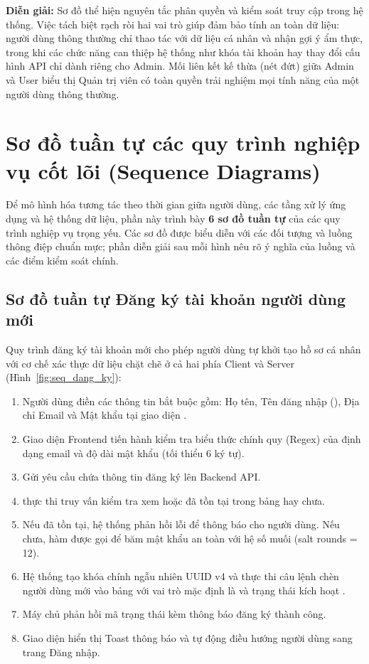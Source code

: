 \noindent\textbf{Diễn giải:} Sơ đồ thể hiện nguyên tắc phân quyền và kiểm soát truy cập trong hệ thống. Việc tách biệt rạch ròi hai vai trò giúp đảm bảo tính an toàn dữ liệu: người dùng thông thường chỉ thao tác với dữ liệu cá nhân và nhận gợi ý ẩm thực, trong khi các chức năng can thiệp hệ thống như khóa tài khoản hay thay đổi cấu hình API chỉ dành riêng cho Admin. Mối liên kết kế thừa (nét đứt) giữa Admin và User biểu thị Quản trị viên có toàn quyền trải nghiệm mọi tính năng của một người dùng thông thường.

\section{Sơ đồ tuần tự các quy trình nghiệp vụ cốt lõi (Sequence Diagrams)}

Để mô hình hóa tương tác theo thời gian giữa người dùng, các tầng xử lý ứng dụng và hệ thống dữ liệu, phần này trình bày \textbf{6 sơ đồ tuần tự } của các quy trình nghiệp vụ trọng yếu. Các sơ đồ được biểu diễn với các đối tượng và luồng thông điệp chuẩn mực; phần diễn giải sau mỗi hình nêu rõ ý nghĩa của luồng và các điểm kiểm soát chính.

\subsection{Sơ đồ tuần tự Đăng ký tài khoản người dùng mới}

Quy trình đăng ký tài khoản mới cho phép người dùng tự khởi tạo hồ sơ cá nhân với cơ chế xác thực dữ liệu chặt chẽ ở cả hai phía Client và Server (Hình~\ref{fig:seq_dang_ky}):
\begin{enumerate}[leftmargin=1.6em, itemsep=2pt]
  \item Người dùng điền các thông tin bắt buộc gồm: Họ tên, Tên đăng nhập (), Địa chỉ Email và Mật khẩu tại giao diện .
  \item Giao diện Frontend tiến hành kiểm tra biểu thức chính quy (Regex) của định dạng email và độ dài mật khẩu (tối thiểu 6 ký tự).
  \item Gửi yêu cầu  chứa thông tin đăng ký lên Backend API.
  \item {} thực thi truy vấn kiểm tra xem  hoặc  đã tồn tại trong bảng  hay chưa.
  \item Nếu đã tồn tại, hệ thống phản hồi lỗi  để thông báo cho người dùng. Nếu chưa, hàm  được gọi để băm mật khẩu an toàn với hệ số muối (salt rounds = 12).
  \item Hệ thống tạo khóa chính ngẫu nhiên UUID v4 và thực thi câu lệnh chèn người dùng mới vào bảng  với vai trò mặc định là  và trạng thái kích hoạt .
  \item Máy chủ phản hồi mã trạng thái  kèm thông báo đăng ký thành công.
  \item Giao diện hiển thị Toast thông báo và tự động điều hướng người dùng sang trang Đăng nhập.
\end{enumerate}

